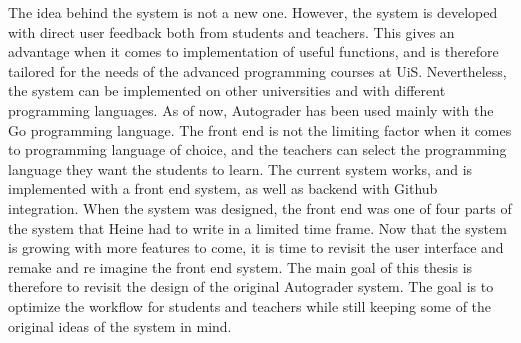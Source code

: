 The idea behind the system is not a new one. However, the system is developed with direct user feedback both from students and teachers. This gives an advantage when it comes to implementation of useful functions, and is therefore tailored for the needs of the advanced programming courses at UiS. Nevertheless, the system can be implemented on other universities and with different programming languages. As of now, Autograder has been used mainly with the Go programming language. The front end is not the limiting factor when it comes to programming language of choice, and the teachers can select the programming language they want the students to learn. The current system works, and is implemented with a front end system, as well as backend with Github integration. When the system was designed, the front end was one of four parts of the system that Heine had to write in a limited time frame. Now that the system is growing with more features to come, it is time to revisit the user interface and remake and re imagine the front end system. The main goal of this thesis is therefore to revisit the design of the original Autograder system. The goal is to optimize the workflow for students and teachers while still keeping some of the original ideas of the system in mind.


%